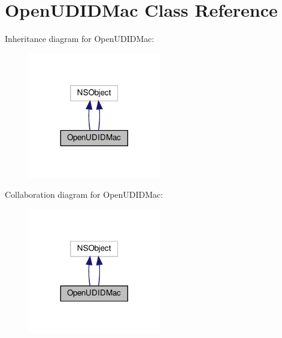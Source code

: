 \hypertarget{interfaceOpenUDIDMac}{}\section{Open\+U\+D\+I\+D\+Mac Class Reference}
\label{interfaceOpenUDIDMac}


Inheritance diagram for Open\+U\+D\+I\+D\+Mac\+:
\nopagebreak
\begin{figure}[H]
\begin{center}
\leavevmode
\includegraphics[width=164pt]{interfaceOpenUDIDMac__inherit__graph}
\end{center}
\end{figure}


Collaboration diagram for Open\+U\+D\+I\+D\+Mac\+:
\nopagebreak
\begin{figure}[H]
\begin{center}
\leavevmode
\includegraphics[width=164pt]{interfaceOpenUDIDMac__coll__graph}
\end{center}
\end{figure}
